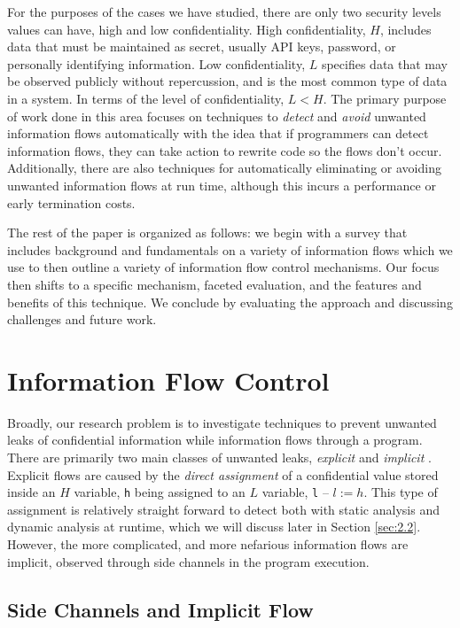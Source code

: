 \documentclass[preprint]{sigplanconf}
\begin{document}
For the purposes of the cases we have studied, there are only two security levels values can have, high and low confidentiality. High confidentiality, $H$, includes data that must be maintained as secret, usually API keys, password, or personally identifying information. Low confidentiality, $L$ specifies data that may be observed publicly without repercussion, and is the most common type of data in a system. In terms of the level of confidentiality, $L < H$. The primary purpose of work done in this area focuses on techniques to \textit{detect} and \textit{avoid} unwanted information flows automatically with the idea that if programmers can detect information flows, they can take action to rewrite code so the flows don't occur. Additionally, there are also techniques for automatically eliminating or avoiding unwanted information flows at run time, although this incurs a performance or early termination costs.

The rest of the paper is organized as follows: we begin with a survey that includes background and fundamentals on a variety of information flows which we use to then outline a variety of information flow control mechanisms. Our focus then shifts to a specific mechanism, faceted evaluation, and the features and benefits of this technique. We conclude by evaluating the approach and discussing challenges and future work.

\section{Information Flow Control}
\label{sec:2}

Broadly, our research problem is to investigate techniques to prevent unwanted leaks of confidential information while information flows through a program. There are primarily two main classes of unwanted leaks, \textit{explicit} and \textit{implicit} \cite{sabelfeld2003language, wiki:informationflow}. Explicit flows are caused by the \textit{direct assignment} of a confidential value stored inside an $H$ variable, \texttt{h} being assigned to an $L$ variable, \texttt{l} -- $l := h$. This type of assignment is relatively straight forward to detect both with static analysis and dynamic analysis at runtime, which we will discuss later in Section \ref{sec:2.2}. However, the more complicated, and more nefarious information flows are implicit, observed through side channels in the program execution.

\subsection*{Side Channels and Implicit Flow}
\label{sec:2.1}
\end{document}
